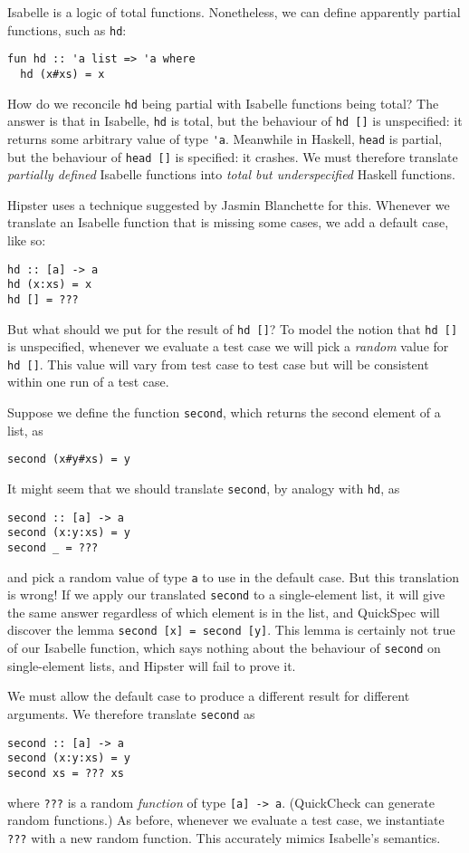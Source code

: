 Isabelle is a logic of total functions. Nonetheless, we can define
apparently partial functions, such as \verb|hd|:
\begin{verbatim}
fun hd :: 'a list => 'a where
  hd (x#xs) = x
\end{verbatim}

How do we reconcile \verb|hd| being partial with Isabelle functions
being total? The answer is that in Isabelle, \verb|hd| is total, but
the behaviour of \verb|hd []| is unspecified: it returns some
arbitrary value of type \verb|'a|. Meanwhile in Haskell, \verb|head|
is partial, but the behaviour of \verb|head []| is specified: it
crashes. We must therefore translate \emph{partially defined} Isabelle
functions into \emph{total but underspecified} Haskell functions.

Hipster uses a technique suggested by Jasmin Blanchette
\cite{blanchettification} for this. Whenever we translate an Isabelle function
that is missing some cases, we add a default case, like so:
\begin{verbatim}
hd :: [a] -> a
hd (x:xs) = x
hd [] = ???
\end{verbatim}

But what should we put for the result of \verb|hd []|? To model the
notion that \verb|hd []| is unspecified, whenever we evaluate a test
case we will pick a \emph{random} value for \verb|hd []|. This value
will vary from test case to test case but will be consistent within
one run of a test case.

Suppose we define the function \verb|second|, which returns the second
element of a list, as
\begin{verbatim}
second (x#y#xs) = y
\end{verbatim}
It might seem that we should translate \verb|second|, by analogy with \verb|hd|, as
\begin{verbatim}
second :: [a] -> a
second (x:y:xs) = y
second _ = ???
\end{verbatim}
and pick a random value of type \verb|a| to use in the default case.
But this translation is wrong! If we apply our translated \verb|second|
to a single-element list, it will give the same answer regardless of which
element is in the list, and QuickSpec will discover the lemma
\verb|second [x] = second [y]|. This lemma is certainly not true of our
Isabelle function, which says nothing about the behaviour
of \verb|second| on single-element lists, and Hipster will fail to
prove it.

We must allow the default case to produce a different result for
different arguments. We therefore translate \verb|second| as
\begin{verbatim}
second :: [a] -> a
second (x:y:xs) = y
second xs = ??? xs
\end{verbatim}
where \verb|???| is a random \emph{function} of type \verb|[a] -> a|.
(QuickCheck can generate random functions.) As before, whenever we
evaluate a test case, we instantiate \verb|???| with a new random function.
This accurately mimics Isabelle's semantics.
